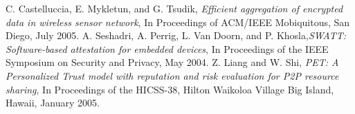 \documentclass[12pt,a4paper,twoside]{report}
\begin{document}
\begin{thebibliography}{99}
 C. Castelluccia, E. Mykletun, and G. Tsudik, \emph{Efficient aggregation of encrypted data in wireless sensor network}, In Proceedings of ACM/IEEE Mobiquitous, San Diego, July 2005.
 A. Seshadri, A. Perrig, L. Van Doorn, and P. Khosla,\emph{SWATT: Software-based attestation for embedded devices}, In Proceedings of the IEEE Symposium on Security and Privacy, May 2004.
 Z. Liang and W. Shi, \emph{PET: A Personalized Trust model with reputation and risk evaluation for P2P resource sharing}, In Proceedings of the HICSS-38, Hilton Waikoloa Village Big Island, Hawaii, January 2005.
\end{thebibliography}
\end{document}
